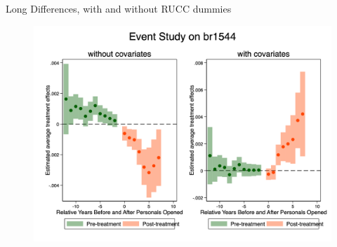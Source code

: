 \documentclass{beamer}
\begin{document}
\begin{frame}{Long Differences, with and without RUCC dummies}

\begin{figure}
    \centering
    \includegraphics[height=0.85\textheight]{./lecture_includes/es_br1544_combined.png}
\end{figure}

\end{frame}
\end{document}

